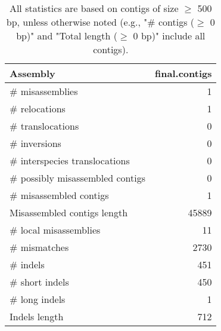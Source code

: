 \documentclass[12pt,a4paper]{article}
\begin{document}
\begin{table}[ht]
\begin{center}
\caption{All statistics are based on contigs of size $\geq$ 500 bp, unless otherwise noted (e.g., "\# contigs ($\geq$ 0 bp)" and "Total length ($\geq$ 0 bp)" include all contigs).}
\begin{tabular}{|l*{1}{|r}|}
\hline
Assembly & final.contigs \\ \hline
\# misassemblies & 1 \\ \hline
\hspace{5mm}\# relocations & 1 \\ \hline
\hspace{5mm}\# translocations & 0 \\ \hline
\hspace{5mm}\# inversions & 0 \\ \hline
\hspace{5mm}\# interspecies translocations & 0 \\ \hline
\# possibly misassembled contigs & 0 \\ \hline
\# misassembled contigs & 1 \\ \hline
Misassembled contigs length & 45889 \\ \hline
\# local misassemblies & 11 \\ \hline
\# mismatches & 2730 \\ \hline
\# indels & 451 \\ \hline
\hspace{5mm}\# short indels & 450 \\ \hline
\hspace{5mm}\# long indels & 1 \\ \hline
Indels length & 712 \\ \hline
\end{tabular}
\end{center}
\end{table}
\end{document}
